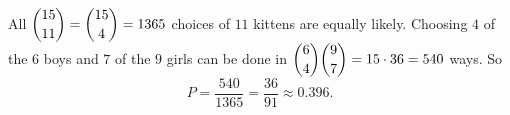 All $\dbinom{15}{11}=\dbinom{15}{4}=1365$ choices of $11$ kittens are equally likely. Choosing $4$ of the $6$ boys and $7$ of the $9$ girls can be done in $\dbinom64\dbinom97=15\cdot36=540$ ways. So
\[
P=\dfrac{540}{1365}=\boxed{\dfrac{36}{91}\approx0.396}.
\]
